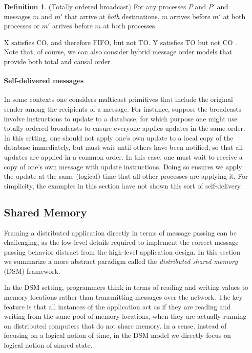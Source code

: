 \documentclass[]             %
{NASA}                       %
\theoremstyle{definition}
\newtheorem{definition}{Definition}[section]
\begin{document}
\begin{definition}(Totally ordered broadcast)
  \label{def:totalorderbroadcast} For any processes $P$ and $P'$ and
  messages $m$ and $m'$ that arrive at \emph{both} destinations, $m$
  arrives before $m'$ at both processes or $m'$ arrives before $m$ at
  both processes.
\end{definition}

X satisfies CO, and therefore FIFO, but not TO. Y satisfies TO but not
CO . Note that, of course, we can also consider hybrid message order
models that provide both total and causal order.

\paragraph{Self-delivered messages}
In some contexts one considers multicast primitives that include the
original sender among the recipients of a message. For instance,
suppose the broadcasts involve instructions to update to a database,
for which purpose one might use totally ordered broadcasts to ensure
everyone applies updates in the same order. In this setting, one
should not apply one's own update to a local copy of the database
immediately, but must wait until others have been notified, so that
all updates are applied in a common order. In this case, one must wait
to receive a copy of one's own message with update instructions. Doing
so ensures we apply the update at the same (logical) time that all
other processes are applying it. For simplicity, the examples in this
section have not shown this sort of self-delivery.

\subsection{Shared Memory}
Framing a distributed application directly in terms of message passing
can be challenging, as the low-level details required to implement the
correct message passing behavior distract from the high-level
application design. In this section we summarize a more abstract
paradigm called the \emph{distributed shared memory} (DSM) framework.

In the DSM setting, programmers think in terms of reading and writing
values to memory locations rather than transmitting messages over the
network. The key feature is that all instances of the application act
as if they are reading and writing from the same pool of memory
locations, when they are actually running on distributed computers
that do not share memory. In a sense, instead of focusing on a logical
notion of time, in the DSM model we directly focus on logical notion
of shared state.
\end{document}
